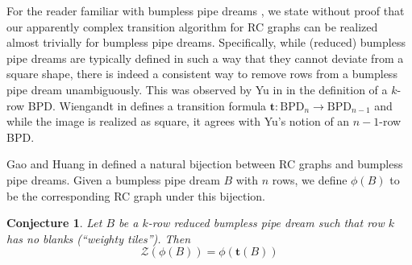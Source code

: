 \documentclass{amsart}
\newtheorem{conjecture}[theorem]{Conjecture}
\theoremstyle{definition}
\theoremstyle{remark}
\numberwithin{equation}{subsection}
\newcommand{\zeromap}{\mathcal{Z}}
\begin{document}
For the reader familiar with bumpless pipe dreams \cite{lam2021back}, we state without proof that our apparently complex transition algorithm for RC graphs can be realized almost trivially for bumpless pipe dreams. Specifically, while (reduced) bumpless pipe dreams are typically defined in such a way that they cannot deviate from a square shape, there is indeed a consistent way to remove rows from a bumpless pipe dream unambiguously. This was observed by Yu in \cite[Lemma~3.18]{Yu2025EmbeddingBP} in the definition of a $k$-row BPD. Wiengandt in \cite{Weigandt2021} defines a transition formula $\mathbf{t}:\mathrm{BPD}_n\to\mathrm{BPD}_{n-1}$ and while the image is realized as square, it agrees with Yu's notion of an $n-1$-row BPD.

Gao and Huang in \cite{GaoHuang2023} defined a natural bijection between RC graphs and bumpless pipe dreams. Given a bumpless pipe dream $B$ with $n$ rows, we define $\phi(B)$ to be the corresponding RC graph under this bijection.
\begin{conjecture}
Let $B$ be a $k$-row reduced bumpless pipe dream such that row $k$ has no blanks (``weighty tiles''). Then 
$$\zeromap(\phi(B)) = \phi(\mathbf{t}(B))$$
\end{conjecture}

\end{document}
